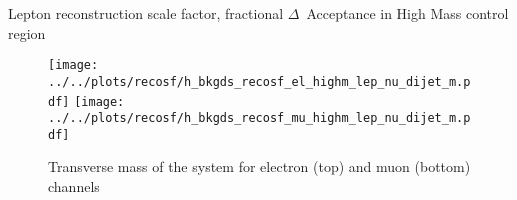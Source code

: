 \documentclass{article}
\begin{document}
\begin{table}[htbp]
  \centering
  \caption{Lepton reconstruction scale factor, fractional $\Delta$~Acceptance in High Mass control region}
\end{table}

\begin{figure}[h]
  \centering
  \texttt{[image: ../../plots/recosf/h\_bkgds\_recosf\_el\_highm\_lep\_nu\_dijet\_m.pdf]}
  \texttt{[image: ../../plots/recosf/h\_bkgds\_recosf\_mu\_highm\_lep\_nu\_dijet\_m.pdf]}
  
  \caption{Transverse mass of the system for electron (top) and muon (bottom) channels}
\end{figure}
\end{document}
